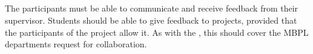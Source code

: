 \subsection{\supervisorgroup{}} %
\label{sub:supervisorPluginDescription}
The participants must be able to communicate and receive feedback from their supervisor.
Students should be able to give feedback to projects, provided that the participants of the project allow it.
As with the \blackboardgroup{} \subsystem{}, this \subsystem{} should cover the MBPL departments request for collaboration.


